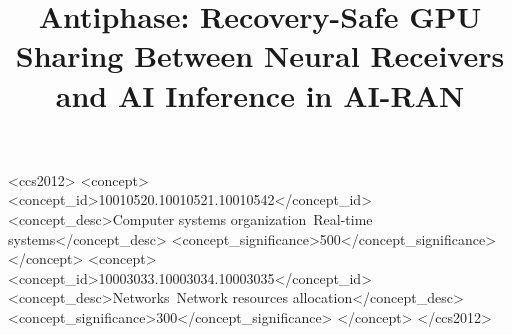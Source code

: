 \documentclass[acmsmall,screen,review,anonymous]{acmart}
\begin{document}
\title[Antiphase: Recovery-Safe GPU Sharing in AI-RAN]{Antiphase: Recovery-Safe GPU Sharing Between
Neural Receivers and AI Inference in AI-RAN}


\begin{CCSXML}
<ccs2012>
 <concept>
  <concept_id>10010520.10010521.10010542</concept_id>
  <concept_desc>Computer systems organization~Real-time systems</concept_desc>
  <concept_significance>500</concept_significance>
 </concept>
 <concept>
  <concept_id>10003033.10003034.10003035</concept_id>
  <concept_desc>Networks~Network resources allocation</concept_desc>
  <concept_significance>300</concept_significance>
 </concept>
</ccs2012>
\end{CCSXML}


\end{document}
